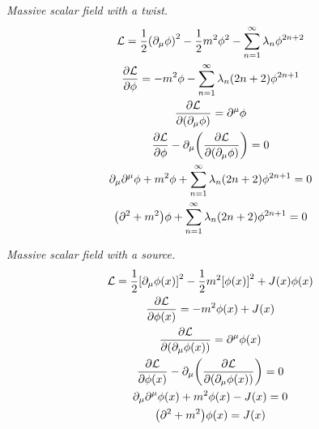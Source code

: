 \documentclass{report}
\begin{document}
\begin{subquests}
	\item \emph{Massive scalar field with a twist.}
	\begin{gather*}
		\mathcal L = \frac{1}{2}\pqty{\partial_{\mu}\phi}^2 - \frac{1}{2}m^2\phi^2 - \sum_{n=1}^{\infty}\lambda_n \phi^{2n+2}\\
		\pdv{\mathcal L}{\phi} = -m^2\phi - \sum_{n=1}^{\infty}\lambda_n \pqty{2n+2}\phi^{2n+1} \\
		\pdv{\mathcal L}{\pqty{\partial_{\mu}\phi}} = \partial^{\mu}\phi \\
		\pdv{\mathcal L}{\phi}-\partial_{\mu}\pqty{\pdv{\mathcal L}{\pqty{\partial_{\mu}\phi}}} = 0 \\
		\partial_{\mu}\partial^{\mu}\phi + m^2\phi + \sum_{n=1}^{\infty}\lambda_n \pqty{2n+2}\phi^{2n+1} = 0 \\
		\pqty{\partial^2 + m^2}\phi + \sum_{n=1}^{\infty}\lambda_n \pqty{2n+2}\phi^{2n+1} = 0
	\end{gather*}

	\item \emph{Massive scalar field with a source.}
	\begin{gather*}
		\mathcal L = \frac{1}{2}\bqty{\partial_{\mu}\phi(x)}^2 - \frac{1}{2}m^2\bqty{\phi(x)}^2 + J(x)\phi(x)\\
		\pdv{\mathcal L}{\phi(x)} = -m^2\phi(x) +J(x) \\
		\pdv{\mathcal L}{\pqty{\partial_{\mu}\phi(x)}} = \partial^{\mu}\phi(x) \\
		\pdv{\mathcal L}{\phi(x)}-\partial_{\mu}\pqty{\pdv{\mathcal L}{\pqty{\partial_{\mu}\phi(x)}}} = 0 \\
		\partial_{\mu}\partial^{\mu}\phi(x) + m^2\phi(x) - J(x) = 0 \\
		\pqty{\partial^2 + m^2}\phi(x) = J(x)
	\end{gather*}


\end{subquests}
\end{document}
